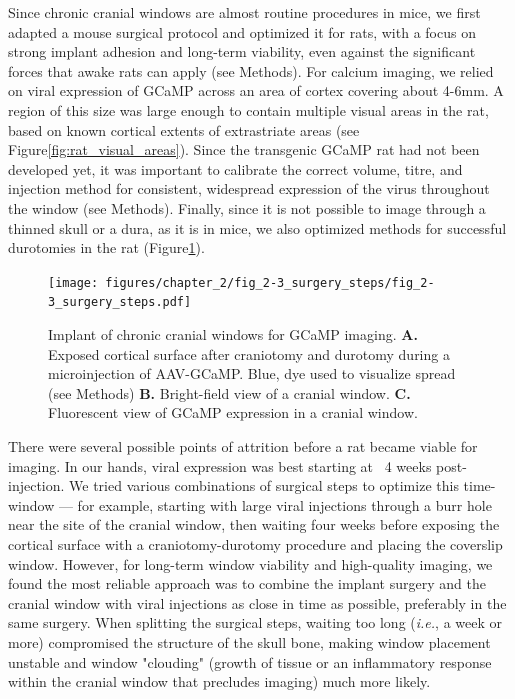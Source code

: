 Since chronic cranial windows are almost routine procedures in mice, we first adapted a mouse surgical protocol\cite{Goldey2014} and optimized it for rats, with a focus on strong implant adhesion and long-term viability, even against the significant forces that awake rats can apply (see Methods). For calcium imaging, we relied on viral expression of GCaMP\cite{Dana2019High-performanceMicrocompartments} across an area of cortex covering about 4-6mm. A region of this size was large enough to contain multiple visual areas in the rat, based on known cortical extents of extrastriate areas (see Figure\ref{fig:rat_visual_areas}). Since the transgenic GCaMP rat \cite{Scott2018} had not been developed yet, it was important to calibrate the correct volume, titre, and injection method for consistent, widespread expression of the virus throughout the window (see Methods). Finally, since it is not possible to image through a thinned skull or a dura, as it is in mice, we also optimized methods for successful durotomies in the rat (Figure\ref{fig:surgery_steps}). 

\begin{figure}[t!]
    \texttt{[image: figures/chapter\_2/fig\_2-3\_surgery\_steps/fig\_2-3\_surgery\_steps.pdf]}
    \vspace{.1in}
    \caption[Chronic cranial window]{Implant of chronic cranial windows for GCaMP imaging. 
    \textbf{A.} Exposed cortical surface after craniotomy and durotomy during a microinjection of AAV-GCaMP. Blue, dye used to visualize spread (see Methods) \textbf{B.} Bright-field view of a cranial window.
    \textbf{C.} Fluorescent view of GCaMP expression in a cranial window.
    \label{fig:surgery_steps}}
\end{figure}

There were several possible points of attrition before a rat became viable for imaging. In our hands, viral expression was best starting at ~4 weeks post-injection. We tried various combinations of surgical steps to optimize this time-window --- for example, starting with large viral injections through a burr hole near the site of the cranial window, then waiting four weeks before exposing the cortical surface with a craniotomy-durotomy procedure and placing the coverslip window. However, for long-term window viability and high-quality imaging, we found the most reliable approach was to combine the implant surgery and the cranial window with viral injections as close in time as possible, preferably in the same surgery. When splitting the surgical steps, waiting too long (\textit{i.e.}, a week or more) compromised the structure of the skull bone, making window placement unstable and window "clouding" (growth of tissue or an inflammatory response within the cranial window that precludes imaging) much more likely. 

